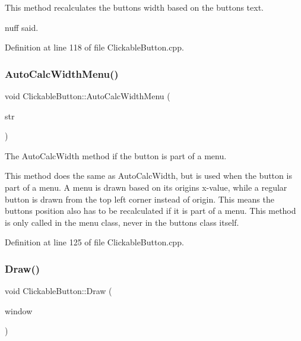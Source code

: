 This method recalculates the button\textquotesingle{}s width based on the button\textquotesingle{}s text. 

\textquotesingle{}nuff said. 

Definition at line 118 of file Clickable\+Button.\+cpp.

\mbox{\label{class_clickable_button_af39cab51ca37c5465bbfec0e5268b768}} 
\subsubsection{\texorpdfstring{Auto\+Calc\+Width\+Menu()}{AutoCalcWidthMenu()}}
{\footnotesize\ttfamily void Clickable\+Button\+::\+Auto\+Calc\+Width\+Menu (\begin{DoxyParamCaption}\item[{std\+::string}]{str }\end{DoxyParamCaption})}



The Auto\+Calc\+Width method if the button is part of a menu. 

This method does the same as Auto\+Calc\+Width, but is used when the button is part of a menu. A menu is drawn based on its origin\textquotesingle{}s x-\/value, while a regular button is drawn from the top left corner instead of origin. This means the button\textquotesingle{}s position also has to be recalculated if it is part of a menu. This method is only called in the menu class, never in the button\textquotesingle{}s class itself. 

Definition at line 125 of file Clickable\+Button.\+cpp.

\mbox{\label{class_clickable_button_a55b5a7b941f25066a8d0481326794b62}} 
\subsubsection{\texorpdfstring{Draw()}{Draw()}}
{\footnotesize\ttfamily void Clickable\+Button\+::\+Draw (\begin{DoxyParamCaption}\item[{sf\+::\+Render\+Window \&}]{window }\end{DoxyParamCaption})\hspace{0.3cm}{\ttfamily [virtual]}}



